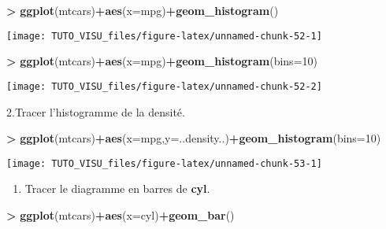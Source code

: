 \documentclass[]{book}
\newenvironment{Shaded}{\begin{snugshade}}{\end{snugshade}}
\newcommand{\DataTypeTok}[1]{\textcolor[rgb]{0.13,0.29,0.53}{#1}}
\newcommand{\DecValTok}[1]{\textcolor[rgb]{0.00,0.00,0.81}{#1}}
\newcommand{\KeywordTok}[1]{\textcolor[rgb]{0.13,0.29,0.53}{\textbf{#1}}}
\newcommand{\NormalTok}[1]{#1}
\newcommand{\OperatorTok}[1]{\textcolor[rgb]{0.81,0.36,0.00}{\textbf{#1}}}
\newcommand{\StringTok}[1]{\textcolor[rgb]{0.31,0.60,0.02}{#1}}
\providecommand{\tightlist}{%
  \setlength{\itemsep}{0pt}\setlength{\parskip}{0pt}}
\theoremstyle{definition}
\theoremstyle{definition}
\theoremstyle{definition}
\theoremstyle{remark}
\begin{document}
\begin{Shaded}
\begin{Highlighting}[]
\OperatorTok{>}\StringTok{ }\KeywordTok{ggplot}\NormalTok{(mtcars)}\OperatorTok{+}\KeywordTok{aes}\NormalTok{(}\DataTypeTok{x=}\NormalTok{mpg)}\OperatorTok{+}\KeywordTok{geom_histogram}\NormalTok{()}
\end{Highlighting}
\end{Shaded}

\begin{center}\texttt{[image: TUTO\_VISU\_files/figure-latex/unnamed-chunk-52-1]} \end{center}

\begin{Shaded}
\begin{Highlighting}[]
\OperatorTok{>}\StringTok{ }\KeywordTok{ggplot}\NormalTok{(mtcars)}\OperatorTok{+}\KeywordTok{aes}\NormalTok{(}\DataTypeTok{x=}\NormalTok{mpg)}\OperatorTok{+}\KeywordTok{geom_histogram}\NormalTok{(}\DataTypeTok{bins=}\DecValTok{10}\NormalTok{)}
\end{Highlighting}
\end{Shaded}

\begin{center}\texttt{[image: TUTO\_VISU\_files/figure-latex/unnamed-chunk-52-2]} \end{center}

2.Tracer l'histogramme de la densité.

\begin{Shaded}
\begin{Highlighting}[]
\OperatorTok{>}\StringTok{ }\KeywordTok{ggplot}\NormalTok{(mtcars)}\OperatorTok{+}\KeywordTok{aes}\NormalTok{(}\DataTypeTok{x=}\NormalTok{mpg,}\DataTypeTok{y=}\NormalTok{..density..)}\OperatorTok{+}\KeywordTok{geom_histogram}\NormalTok{(}\DataTypeTok{bins=}\DecValTok{10}\NormalTok{)}
\end{Highlighting}
\end{Shaded}

\begin{center}\texttt{[image: TUTO\_VISU\_files/figure-latex/unnamed-chunk-53-1]} \end{center}

\begin{enumerate}
\def\labelenumi{\arabic{enumi}.}
\setcounter{enumi}{2}
\tightlist
\item
  Tracer le diagramme en barres de \textbf{cyl}.
\end{enumerate}

\begin{Shaded}
\begin{Highlighting}[]
\OperatorTok{>}\StringTok{ }\KeywordTok{ggplot}\NormalTok{(mtcars)}\OperatorTok{+}\KeywordTok{aes}\NormalTok{(}\DataTypeTok{x=}\NormalTok{cyl)}\OperatorTok{+}\KeywordTok{geom_bar}\NormalTok{()}
\end{Highlighting}
\end{Shaded}
\end{document}
